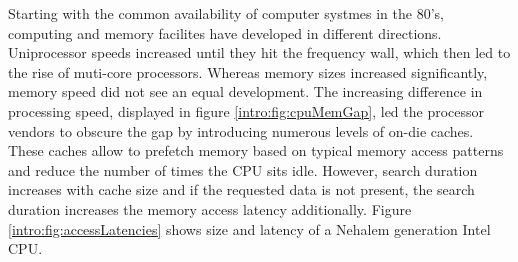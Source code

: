 Starting with the common availability of computer systmes in the 80's,
computing and memory facilites have developed in different directions.
Uniprocessor speeds increased until they hit the frequency wall, which then led
to the rise of muti-core processors.
Whereas memory sizes increased significantly, memory speed did not see an
equal development.
The increasing difference in processing speed, displayed in figure
\ref{intro:fig:cpuMemGap}, led the processor vendors to obscure the gap by
introducing numerous levels of on-die caches.
These caches allow to prefetch memory based on typical memory access patterns
and reduce the number of times the CPU sits idle.
However, search duration increases with cache size and if the requested data is
not present, the search duration increases the memory access latency additionally.
Figure \ref{intro:fig:accessLatencies} shows size and latency of a Nehalem
generation Intel CPU.

